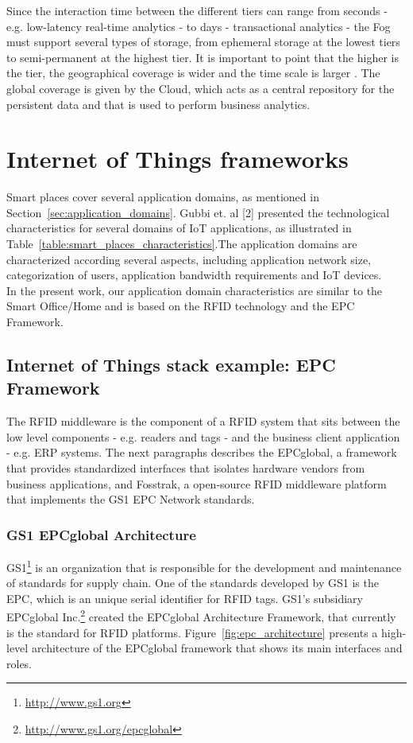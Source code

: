 Since the interaction time between the different tiers can range from seconds - e.g. low-latency real-time
analytics - to days - transactional analytics - the Fog must support several types of storage, from
ephemeral storage at the lowest tiers to semi-permanent at the highest tier. It is important to point
that the higher is the tier, the geographical coverage is wider and the time scale is larger \cite{bonomi2014fog}.
The global coverage is given by the Cloud, which acts as a central repository for the persistent data
and that is used to perform business analytics.

\section{Internet of Things frameworks}
\label{sec:iot_domains}
Smart places cover several application domains, as mentioned in Section~\ref{sec:application_domains}.
Gubbi et. al [2] presented the technological characteristics for several domains of IoT applications,
as illustrated in Table~\ref{table:smart_places_characteristics}.The application domains are characterized
according several aspects, including application network size, categorization of users, application
bandwidth requirements and \gls{IoT} devices.\\

In the present work, our application domain characteristics are similar to the Smart Office/Home and
is based on the \gls{RFID} technology and the \gls{EPC} Framework.

\subsection{Internet of Things stack example: EPC Framework}
\label{subs:iot_stack}
The \gls{RFID} middleware is the component of a \gls{RFID} system that sits between the low level
components - e.g. readers and tags - and the business client application - e.g. \gls{ERP} systems.
The next paragraphs describes the EPCglobal, a framework that provides standardized interfaces that
isolates hardware vendors from business applications, and Fosstrak, a open-source \gls{RFID}
middleware platform that implements the GS1 \gls{EPC} Network standards.

\subsubsection{GS1 EPCglobal Architecture}
\label{subs:epc_network}
GS1\footnote{\url{http://www.gs1.org}} is an organization that is responsible for the development and
maintenance of standards for supply chain. One of the standards developed by GS1 is the \gls{EPC},
which is an unique serial identifier for \gls{RFID} tags. GS1's subsidiary EPCglobal Inc.\footnote{\url{http://www.gs1.org/epcglobal}} created
the EPCglobal Architecture Framework, that currently is the standard for \gls{RFID} platforms.
Figure~\ref{fig:epc_architecture} presents a high-level architecture of the EPCglobal framework
that shows its main interfaces and roles.\\


